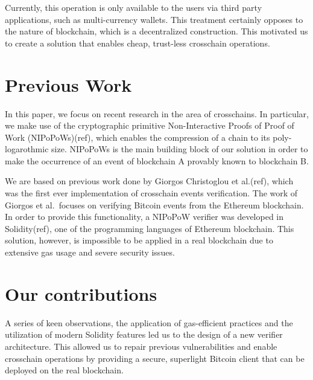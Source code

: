 Currently, this operation is only available to the users via third party
applications, such as multi-currency wallets. This treatment certainly
opposes to the nature of blockchain, which is a decentralized construction.
This motivated us to create a solution that enables cheap, trust-less
crosschain operations.

\section{Previous Work}

In this paper, we focus on recent research in the area of crosschains.
In particular, we make use of the cryptographic primitive
Non-Interactive Proofs of Proof of Work (NIPoPoWs)(ref), which enables
the compression of a chain to its poly-logarothmic size. NIPoPoWs is the
main building block of our solution in order to make the occurrence of
an event of blockchain A provably known to blockchain B.

We are based on previous work done by Giorgos Christoglou et al.(ref),
which was the first ever implementation of crosschain events
verification. The work of Giorgos et al.\ focuses on verifying Bitcoin
events from the Ethereum blockchain. In order to provide this
functionality, a NIPoPoW verifier was developed in Solidity(ref), one of
the programming languages of Ethereum blockchain. This solution,
however, is impossible to be applied in a real blockchain due to
extensive gas usage and severe security issues.


\section{Our contributions}

A series of keen observations, the application of gas-efficient
practices and the utilization of modern Solidity features led us to the
design of a new verifier architecture. This allowed us to repair
previous vulnerabilities and enable crosschain operations by providing a
secure, superlight Bitcoin client that can be deployed on the real
blockchain.


